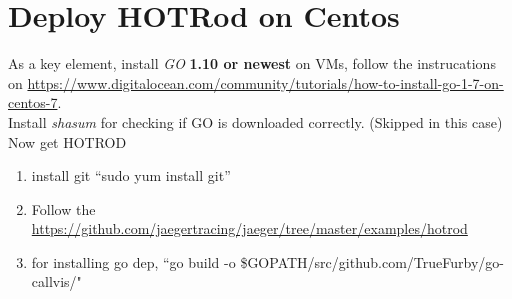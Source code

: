 \documentclass[10pt,twocolumn,letterpaper]{article}
\begin{document}
\section{Deploy HOTRod on Centos}
As a key element, install \textit{GO} \textbf{1.10 or newest} on VMs,
follow the instrucations on \url{https://www.digitalocean.com/community/tutorials/how-to-install-go-1-7-on-centos-7}.\\

Install \textit{shasum} for checking if GO is downloaded correctly. (Skipped in this case)\\

Now get HOTROD
\begin{enumerate}
\item install git ``sudo yum install git''
\item Follow the \url{https://github.com/jaegertracing/jaeger/tree/master/examples/hotrod}

\item for installing go dep, ``go build -o \$GOPATH/src/github.com/TrueFurby/go-callvis/"
\end{enumerate}
\end{document}
